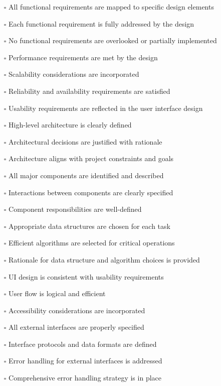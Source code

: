 \documentclass[12pt, titlepage]{article}
\begin{document}
\begin{itemize}
  \item[$\square$] All functional requirements are mapped to specific
    design elements
  \item[$\square$] Each functional requirement is fully addressed by the design
  \item[$\square$] No functional requirements are overlooked or
    partially implemented
  \item[$\square$] Performance requirements are met by the design
  \item[$\square$] Scalability considerations are incorporated
  \item[$\square$] Reliability and availability requirements are satisfied
  \item[$\square$] Usability requirements are reflected in the user
    interface design
  \item[$\square$] High-level architecture is clearly defined
  \item[$\square$] Architectural decisions are justified with rationale
  \item[$\square$] Architecture aligns with project constraints and goals
  \item[$\square$] All major components are identified and described
  \item[$\square$] Interactions between components are clearly specified
  \item[$\square$] Component responsibilities are well-defined
  \item[$\square$] Appropriate data structures are chosen for each task
  \item[$\square$] Efficient algorithms are selected for critical operations
  \item[$\square$] Rationale for data structure and algorithm choices
    is provided
  \item[$\square$] UI design is consistent with usability requirements
  \item[$\square$] User flow is logical and efficient
  \item[$\square$] Accessibility considerations are incorporated
  \item[$\square$] All external interfaces are properly specified
  \item[$\square$] Interface protocols and data formats are defined
  \item[$\square$] Error handling for external interfaces is addressed
  \item[$\square$] Comprehensive error handling strategy is in place

\end{itemize}
\end{document}
